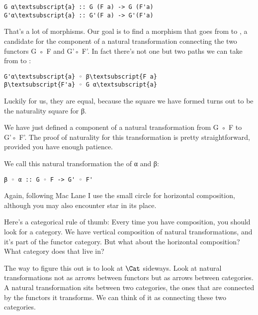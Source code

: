 \begin{Verbatim}[commandchars=\\\{\}]
G α\textsubscript{a} :: G (F a) -> G (F'a)
G'α\textsubscript{a} :: G'(F a) -> G'(F'a)
\end{Verbatim}
That's a lot of morphisms. Our goal is to find a morphism that goes from
 to , a candidate for the
component of a natural transformation connecting the two functors G ◦ F
and G'◦ F'. In fact there's not one but two paths we can take from
 to :

\begin{Verbatim}[commandchars=\\\{\}]
G'α\textsubscript{a} ◦ β\textsubscript{F a}
β\textsubscript{F'a} ◦ G α\textsubscript{a}
\end{Verbatim}
Luckily for us, they are equal, because the square we have formed turns
out to be the naturality square for β.

We have just defined a component of a natural transformation from G ◦ F
to G'◦ F'. The proof of naturality for this transformation is pretty
straightforward, provided you have enough patience.

We call this natural transformation the  of
α and β:

\begin{Verbatim}[commandchars=\\\{\}]
β ◦ α :: G ◦ F -> G' ◦ F'
\end{Verbatim}
Again, following Mac Lane I use the small circle for horizontal
composition, although you may also encounter star in its place.

Here's a categorical rule of thumb: Every time you have composition, you
should look for a category. We have vertical composition of natural
transformations, and it's part of the functor category. But what about
the horizontal composition? What category does that live in?

The way to figure this out is to look at $\Cat$ sideways. Look at
natural transformations not as arrows between functors but as arrows
between categories. A natural transformation sits between two
categories, the ones that are connected by the functors it transforms.
We can think of it as connecting these two categories.

\begin{figure}[H]
\centering
{}
\end{figure}

